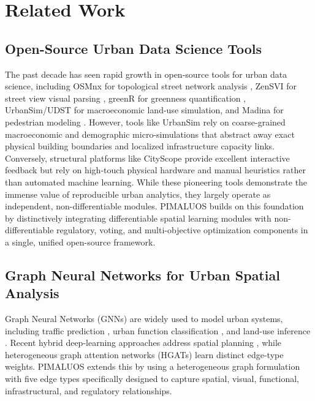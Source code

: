 \documentclass[final,3p,times]{elsarticle}
\begin{document}

\section{Related Work}

\subsection{Open-Source Urban Data Science Tools}
The past decade has seen rapid growth in open-source tools for urban data science, including OSMnx for topological street network analysis \cite{boeing2017osmnx}, ZenSVI for street view visual parsing \cite{ito2025zensvi}, greenR for greenness quantification \cite{mahajan2024greenr}, UrbanSim/UDST for macroeconomic land-use simulation, and Madina for pedestrian modeling \cite{sevtsuk2025madina}. However, tools like UrbanSim rely on coarse-grained macroeconomic and demographic micro-simulations that abstract away exact physical building boundaries and localized infrastructure capacity links. Conversely, structural platforms like CityScope \cite{alonso2018cityscope} provide excellent interactive feedback but rely on high-touch physical hardware and manual heuristics rather than automated machine learning. While these pioneering tools demonstrate the immense value of reproducible urban analytics, they largely operate as independent, non-differentiable modules. PIMALUOS builds on this foundation by distinctively integrating differentiable spatial learning modules with non-differentiable regulatory, voting, and multi-objective optimization components in a single, unified open-source framework.

\subsection{Graph Neural Networks for Urban Spatial Analysis}
Graph Neural Networks (GNNs) are widely used to model urban systems, including traffic prediction \cite{jiang2022graph,wang2020deep}, urban function classification \cite{liu2023urban}, and land-use inference \cite{yao2017sensing}. Recent hybrid deep-learning approaches address spatial planning \cite{guo2019attention,zheng2023spatial}, while heterogeneous graph attention networks (HGATs) \cite{abadal2021computing} learn distinct edge-type weights. PIMALUOS extends this by using a heterogeneous graph formulation with five edge types specifically designed to capture spatial, visual, functional, infrastructural, and regulatory relationships.
\end{document}
